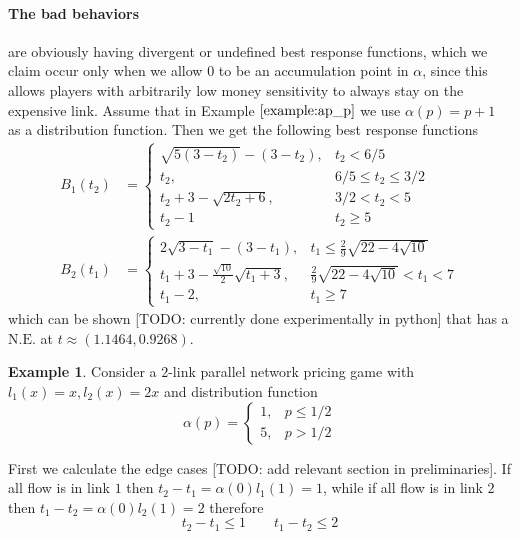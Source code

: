 \documentclass[10pt,a4paper]{book}
\newcommand{\NE}{\mathrm{N.E.}}
\theoremstyle{definition}
\theoremstyle{comment}
\newtheorem{example}[definition]{Example}
\begin{document}
\paragraph{The bad behaviors} are obviously having divergent or undefined best response functions, which we claim occur only when we allow $0$ to be an accumulation point in $\alpha$, since this allows players with arbitrarily low money sensitivity to always stay on the expensive link.
Assume that in Example $\ref{example:ap_p}$ we use $\alpha(p) = p + 1$ as a distribution function.
Then we get the following best response functions
\begin{align*}
	B_1(t_2) &=
	\begin{cases}
		\sqrt{5 (3 - t_2)} - (3 - t_2), & t_2 < 6/5 \\
		t_2, & 6/5 \le t_2 \le 3/2 \\
		t_2 + 3 - \sqrt{2 t_2 + 6}, & 3/2 < t_2 < 5 \\
		t_2 - 1 & t_2 \ge 5
	\end{cases}\\
	B_2(t_1) &=
	\begin{cases}
		2 \sqrt{3 - t_1} - (3 - t_1), & t_1 \le \frac29 \sqrt{22 - 4 \sqrt{10}} \\
		t_1 + 3 - \frac{\sqrt{10}}2 \sqrt{t_1 + 3}, & \frac29 \sqrt{22 - 4 \sqrt{10}} < t_1 < 7 \\
		t_1 - 2, & t_1 \ge 7
	\end{cases}
\end{align*}
which can be shown [TODO: currently done experimentally in python] that has a $\NE$ at $t \approx (1.1464, 0.9268)$.


\begin{example}
	Consider a $2$-link parallel network pricing game with $l_1(x) = x, l_2(x) = 2x$ and distribution function
	\[
		\alpha(p) =
		\begin{cases}
			1, & p \le 1/2 \\
			5, & p > 1/2
		\end{cases}
	\]
\end{example}

First we calculate the edge cases [TODO: add relevant section in preliminaries].
If all flow is in link $1$ then $t_2 - t_1 = \alpha(0) l_1(1) = 1$, while if all flow is in link $2$ then $t_1 - t_2 = \alpha(0) l_2(1) = 2$ therefore
\[t_2 - t_1 \le 1 \qquad t_1 - t_2 \le 2\]
\end{document}
